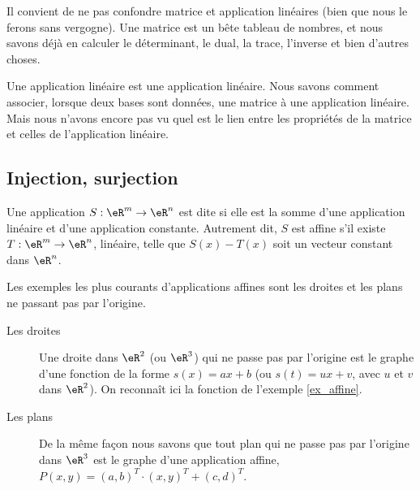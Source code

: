 \begin{normaltext}
    Il convient de ne pas confondre matrice et application linéaires (bien que nous le ferons sans vergogne). Une matrice est un bête tableau de nombres, et nous savons déjà en calculer le déterminant, le dual, la trace, l'inverse et bien d'autres choses.

    Une application linéaire est une application linéaire. Nous savons comment associer, lorsque deux bases sont données, une matrice à une application linéaire. Mais nous n'avons encore pas vu quel est le lien entre les propriétés de la matrice et celles de l'application linéaire.
\end{normaltext}

\subsection{Injection, surjection}

\begin{definition}
  Une application $S: \eR^m\to\eR^n$ est dite  si elle est la somme d'une application linéaire et d'une application constante. Autrement dit, $S$ est affine s'il existe $T: \eR^m\to\eR^n$, linéaire, telle que $S(x)-T(x)$ soit un vecteur constant dans $\eR^n$. 
\end{definition}

\begin{example}
	Les exemples les plus courants d'applications affines sont les droites et les plans ne passant pas par l'origine.
	\begin{description}
		\item[Les droites] Une droite dans $\eR^2$ (ou $\eR^3$) qui ne passe pas par l'origine est le graphe d'une fonction de la forme $s(x)=ax+b$ (ou $s(t)=u x +v$, avec $u$ et $v$  dans $\eR^2$). On reconnaît ici la fonction de l'exemple \ref{ex_affine}.
			
		\item[Les plans]
			De la même façon nous savons que tout plan qui ne passe pas par l'origine dans $\eR^3$ est le graphe d'une application affine, $P(x,y)= (a,b)^T\cdot(x,y)^T+(c,d)^T$.
	\end{description}
\end{example}

